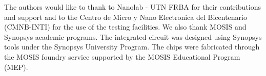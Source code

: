 The authors would like to thank to Nanolab - UTN FRBA for their contributions and support and to the Centro de Micro y Nano Electronica del Bicentenario (CMNB-INTI) for the use of the testing facilities. 
We also thank MOSIS and Synopsys academic programs.
The integrated circuit was designed using Synopsys tools under the Synopsys University Program. The chips were fabricated through the MOSIS foundry service supported by the MOSIS Educational Program (MEP).